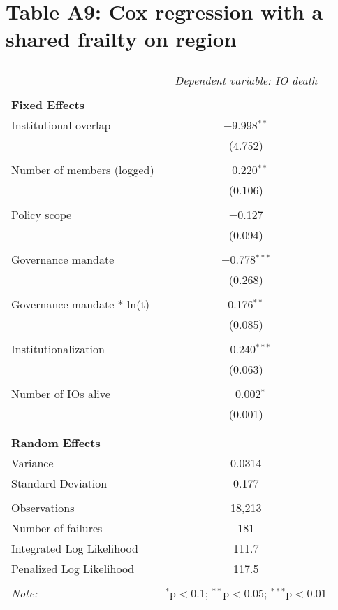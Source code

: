 \documentclass[12pt]{article}
\begin{document}
\section*{Table A9: Cox regression with a shared frailty on region}

\begin{table}[H] 
\centering 
\footnotesize
\label{tab:coxme_model} 
\begin{tabular}{@{\extracolsep{5pt}}lc} 
\\[-1.8ex]\hline 
\hline \\[-1.8ex] 
 & \multicolumn{1}{c}{\textit{Dependent variable: IO death}} \\ 
\hline \\[-1.8ex] 
\textbf{Fixed Effects} &  \\ 
Institutional overlap & $-$9.998$^{**}$ \\ 
  & (4.752) \\ 
  & \\ 
Number of members (logged) & $-$0.220$^{**}$ \\ 
  & (0.106) \\ 
  & \\ 
Policy scope & $-$0.127 \\ 
  & (0.094) \\ 
  & \\ 
Governance mandate & $-$0.778$^{***}$ \\ 
  & (0.268) \\ 
  & \\ 
Governance mandate * ln(t) & 0.176$^{**}$ \\ 
  & (0.085) \\ 
  & \\ 
Institutionalization & $-$0.240$^{***}$ \\ 
  & (0.063) \\ 
  & \\ 
Number of IOs alive & $-$0.002$^{*}$ \\ 
  & (0.001) \\ 
  & \\ 
\hline \\[-1.8ex] 
\textbf{Random Effects} &  \\  
Variance & 0.0314 \\ 
Standard Deviation & 0.177 \\ 
\hline \\[-1.8ex] 
Observations & 18,213 \\ 
Number of failures & 181 \\ 
Integrated Log Likelihood & 111.7 \\ 
Penalized Log Likelihood & 117.5 \\ 
\hline 
\hline \\[-1.8ex] 
\textit{Note:} & \multicolumn{1}{r}{$^{*}$p$<$0.1; $^{**}$p$<$0.05; $^{***}$p$<$0.01} \\ 
\end{tabular} 
\end{table} 
\end{document}
